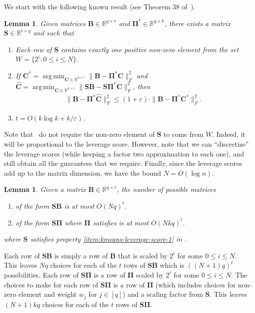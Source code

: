 \documentclass[11pt]{article}
\makeatletter
\DeclareMathOperator*{\argmin}{arg\,min}
\theoremstyle{plain}
\newtheorem{lemma}[theorem]{Lemma}
\theoremstyle{plain}
\theoremstyle{definition}
\theoremstyle{plain}
\theoremstyle{remark}
\newenvironment{proof}[1][\protect\proofname]{\par
	\normalfont\topsep6\p@\@plus6\p@\relax
	\trivlist
	\itemindent\parindent
	\item[\hskip\labelsep\scshape #1]\ignorespaces
}{\endtrivlist\@endpefalse
}
\providecommand{\proofname}{Proof}
\newcommand{\RR}{\mathbb{R}}
\makeatother
\begin{document}
We start with the following known result (see Theorem 38 of~\cite{clarkson2017low}).
\begin{lemma}
\label{lem:kmeans-leverage-score}
Given matrices $\bm{B}\in \RR^{q\times r}$ and $\bm{\Pi}^* \in \RR^{q\times k}$, there exists a matrix $\bm{S}\in \RR^{t\times q}$ and such that 
    \begin{enumerate}
   \item  \label{item:kmeans-leverage-score-1} Each row of $\bm{S}$ contains exactly one positive non-zero element from the set $W=\{2^{i}: 0\leq i\leq N\}$.
    \item  \label{item:kmeans-leverage-score-2} If $\bm{C}^*=\argmin_{\bm{C}\in \RR^{k\times r}}\|\bm{B}-\bm{\Pi}^*\bm{C}\|_F^2$ and $\widehat{\bm{C}}=\argmin_{\bm{C}\in \RR^{k\times r}}\|\bm{S}\bm{B}-\bm{S}\bm{\Pi}^*\bm{C}\|_F^2$, then 
    \begin{align}
        \|\bm{B}-\bm{\Pi}^*\widehat{\bm{C}}\|_F^2\leq (1+\varepsilon)\cdot \|\bm{B}-\bm{\Pi}^*\bm{C}^*\|_F^2.
    \end{align}
    \item $t=O(k\log k +k/\varepsilon)$.
    \end{enumerate}
\end{lemma}
Note that~\cite{clarkson2017low} do not require the non-zero element of $\bm{S}$ to come from $W$. Indeed, it will be proportional to the leverage score. However, note that we can ``discretize'' the leverage scores (while keeping a factor two approximation to each one), and still obtain all the guarantees that we require. Finally, since the leverage scores add up to the matrix dimension, we have the bound $N = O(\log n)$.

\begin{lemma}
    \label{lem:k-means-enum-smart}
   Given a matrix $\bm{B}\in \RR^{q\times r}$, the number of possible matrices
   \begin{enumerate}
       \item of the form $\bm{S}\bm{B}$ is at most $O(Nq)^t$.
       \item of the form $\bm{S}\bm{\Pi}$ where $\bm{\Pi}$ satisfies  is at most $O(Nkq)^t$.
   \end{enumerate}
where $\bm{S}$ satisfies property \ref{item:kmeans-leverage-score-1} in .
\end{lemma}
\begin{proof}
    Each row of $\bm{S}\bm{B}$ is simply a row of $\bm{B}$ that is scaled by $2^{i}$ for some $0\leq i\leq N$. This leaves $Nq$ choices for each of the $t$ rows of $\bm{S}\bm{B}$ which is $((N+1)q)^t$ possibilities. Each row of $\bm{S}\bm{\Pi}$ is a row of $\bm{\Pi}$ scaled by $2^{i}$ for some $0\leq i \leq N$. The choices to make for each row of $\bm{S}\bm{\Pi}$ is a row of $\bm{\Pi}$ (which includes choices for non-zero element and weight $w_j$ for $j\in [q]$) and a scaling factor from $\bm{S}$. This leaves $(N+1)kq$ choices for each of the $t$ rows of $\bm{S}\bm{\Pi}$. 
\end{proof}
\end{document}
